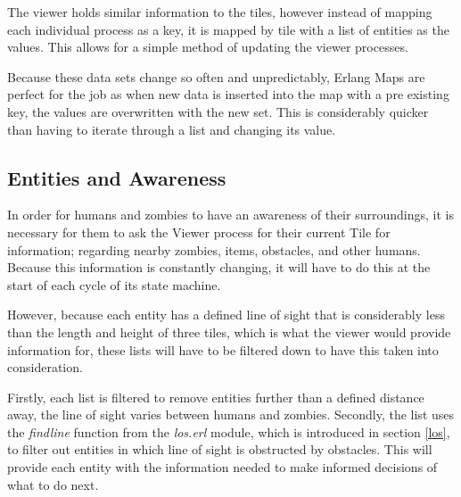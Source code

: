 The viewer holds similar information to the tiles, however instead of mapping each individual process as a key, it is mapped by tile with a list of entities as the values. This allows for a simple method of updating the viewer processes.

Because these data sets change so often and unpredictably, Erlang Maps are perfect for the job as when new data is inserted into the map with a pre existing key, the values are overwritten with the new set. This is considerably quicker than having to iterate through a list and changing its value.

\subsection{Entities and Awareness}
\label{entities_awareness}
\label{viewer_intro}
In order for humans and zombies to have an awareness of their surroundings, it is necessary for them to ask the Viewer process for their current Tile for information; regarding nearby zombies, items, obstacles, and other humans. Because this information is constantly changing, it will have to do this at the start of each cycle of its state machine.

However, because each entity has a defined line of sight that is considerably less than the length and height of three tiles, which is what the viewer would provide information for, these lists will have to be filtered down to have this taken into consideration.

Firstly, each list is filtered to remove entities further than a defined distance away, the line of sight varies between humans and zombies. Secondly, the list uses the \emph{findline} function from the \emph{los.erl} module, which is introduced in section \ref{los}, to filter out entities in which line of sight is obstructed by obstacles. This will provide each entity with the information needed to make informed decisions of what to do next.

